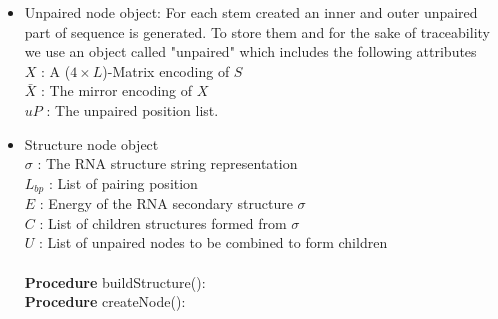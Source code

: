 \begin{itemize}
	
	\item Unpaired node object: For each stem created an inner and outer unpaired part of sequence is generated. To store them and for the sake of traceability we use an object called "unpaired" which includes the following attributes \\
	\hspace*{0.2cm} $X$ : A ($4\times L$)-Matrix encoding of $S$ \\
	\hspace*{0.2cm} $\bar{X}$ : The mirror encoding of $X$ \\
	\hspace*{0.2cm} $uP$ : The unpaired position list.\\
	\hspace*{0.2cm} 
	
	\item Structure node object \\
	\hspace*{0.2cm} $\sigma$ : The RNA structure string representation \\
	\hspace*{0.2cm} $L_{bp}$ : List of pairing position\\
	\hspace*{0.2cm} $E$ : Energy of the RNA secondary structure $\sigma$\\
	\hspace*{0.2cm} $C$ : List of children structures formed from $\sigma$\\
	\hspace*{0.2cm} $U$ : List of unpaired nodes to be combined to form children\\
	\\ 
	\hspace*{0.2cm}\textbf{Procedure} buildStructure(): \\
	\hspace*{0.2cm}\textbf{Procedure} createNode(): 
\end{itemize}

